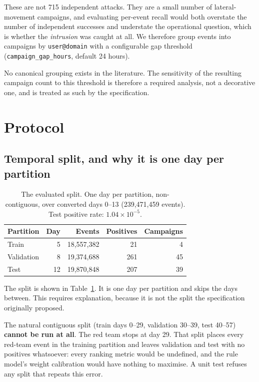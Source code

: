 \documentclass[11pt,a4paper]{article}
\begin{document}
These are not 715 independent attacks. They are a small number of
lateral-movement campaigns, and evaluating per-event recall would both overstate
the number of independent successes and understate the operational question,
which is whether the \emph{intrusion} was caught at all. We therefore group
events into campaigns by \texttt{user@domain} with a configurable gap threshold
(\texttt{campaign\_gap\_hours}, default 24 hours).

No canonical grouping exists in the literature. The sensitivity of the resulting
campaign count to this threshold is therefore a required analysis, not a
decorative one, and is treated as such by the specification.

\section{Protocol}

\subsection{Temporal split, and why it is one day per partition}
\label{sec:split}

\begin{table}[t]
\centering
\begin{tabular}{lrrrr}
\toprule
Partition & Day & Events & Positives & Campaigns \\
\midrule
Train      & 5  & 18{,}557{,}382 & 21  & 4  \\
Validation & 8  & 19{,}374{,}688 & 261 & 45 \\
Test       & 12 & 19{,}870{,}848 & 207 & 39 \\
\bottomrule
\end{tabular}
\caption{The evaluated split. One day per partition, non-contiguous, over
converted days 0--13 (239{,}471{,}459 events). Test positive rate:
$1.04 \times 10^{-5}$.}
\label{tab:split}
\end{table}

The split is shown in Table~\ref{tab:split}. It is one day per partition and
skips the days between. This requires explanation, because it is not the split
the specification originally proposed.

The natural contiguous split (train days 0--29, validation 30--39, test 40--57)
\textbf{cannot be run at all}. The red team stops at day 29. That split
places every red-team event in the training partition and leaves validation and
test with no positives whatsoever: every ranking metric would be undefined, and
the rule model's weight calibration would have nothing to maximise. A unit test
refuses any split that repeats this error.
\end{document}
